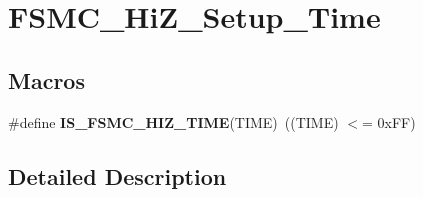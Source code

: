 \hypertarget{group___f_s_m_c___hi_z___setup___time}{}\section{F\+S\+M\+C\+\_\+\+Hi\+Z\+\_\+\+Setup\+\_\+\+Time}
\label{group___f_s_m_c___hi_z___setup___time}
\subsection*{Macros}
\begin{DoxyCompactItemize}
\item 
\hypertarget{group___f_s_m_c___hi_z___setup___time_gaeb6295e8cc1a524f060c5e780f868033}{}\#define {\bfseries I\+S\+\_\+\+F\+S\+M\+C\+\_\+\+H\+I\+Z\+\_\+\+T\+I\+M\+E}(T\+I\+M\+E)~((T\+I\+M\+E) $<$= 0x\+F\+F)\label{group___f_s_m_c___hi_z___setup___time_gaeb6295e8cc1a524f060c5e780f868033}

\end{DoxyCompactItemize}


\subsection{Detailed Description}
